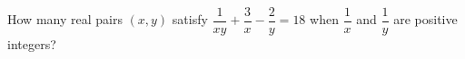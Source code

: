 How many real pairs $(x,y)$ satisfy $\dfrac{1}{xy}+\dfrac{3}{x}-\dfrac{2}{y}=18$ when $\dfrac{1}{x}$ and $\dfrac{1}{y}$ are positive integers?
